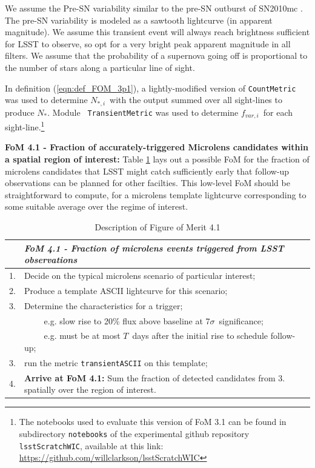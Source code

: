 We assume the Pre-SN variability similar to the pre-SN outburst of
SN2010mc \citep{2013Natur.494...65O}. The pre-SN variability is
modeled as a sawtooth lightcurve (in apparent magnitude). We assume
this transient event will always reach brightness sufficient for LSST
to observe, so opt for a very bright peak apparent magnitude in all
filters. We assume that the probability of a supernova going off is
proportional to the number of stars along a particular line of
sight.

In definition (\ref{eqn:def_FOM_3p1}), a lightly-modified version of
{\tt CountMetric} was used to determine $N_{\ast, i}$~with the output
summed over all sight-lines to produce $N_{\ast}$. Module {\tt
  TransientMetric} was used to determine $f_{var, i}$~for each
sight-line.\footnote{The notebooks used to evaluate this version of
  FoM 3.1 can be found in subdirectory {\tt notebooks} of the
  experimental github repository {\tt lsstScratchWIC}, available at
  this link: \url{https://github.com/willclarkson/lsstScratchWIC}}


{\bf FoM 4.1 - Fraction of accurately-triggered Microlens candidates
  within a spatial region of interest:} Table
  \ref{table:pseudoFOM_4p1} lays out a possible FoM for the fraction
  of microlens candidates that LSST might catch sufficiently early
  that follow-up observations can be planned for other facilties. This
  low-level FoM should be straightforward to compute, for a microlens
  template lightcurve corresponding to some suitable average over the
  regime of interest.

\begin{table}[h]
  \small
  \begin{tabular}{c p{12cm}}
    & {\it FoM 4.1 - Fraction of microlens events triggered from LSST observations} \\
    \hline
  1. & Decide on the typical microlens scenario of particular interest; \\
  2. & Produce a template ASCII lightcurve for this scenario; \\
  3. & Determine the characteristics for a trigger; \\
     & ~~~~ e.g. slow rise to 20\% flux above baseline at 7$\sigma$~significance;\\
     & ~~~~ e.g. must be at most $T$~days after the initial rise to schedule follow-up; \\
  3. & run the metric {\tt transientASCII} on this template; \\
  4. & {\bf Arrive at FoM 4.1:} Sum the fraction of detected candidates from 3. spatially over the region of interest.\\
\hline
    \end{tabular}
 \caption{Description of Figure of Merit 4.1}
  \label{table:pseudoFOM_4p1}
\end{table}

